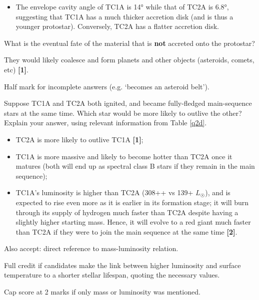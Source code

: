 \documentclass[a4paper,11pt,draft]{exam}
\begin{document}
\begin{questions}
\begin{solution}
\begin{itemize}[leftmargin=10pt]
			\item The envelope cavity angle of TC1A is \ang{14} while that of TC2A is \ang{6.8}, suggesting that TC1A has a much thicker accretion disk (and is thus a younger protostar). Conversely, TC2A has a flatter accretion disk. 
		\end{itemize}
	\end{solution}

\filbreak
\question[1]
	What is the eventual fate of the material that is \textbf{not} accreted onto the protostar?
	\droppoints
	\begin{solution}
		They would likely coalesce and form planets and other objects (asteroids, comets, etc) \textbf{[1]}. 
		
		Half mark for incomplete answers (e.g. `becomes an asteroid belt').
	\end{solution}
	
\question[3]
	Suppose TC1A and TC2A both ignited, and became fully-fledged main-sequence stars at the same time. Which star would be more likely to outlive the other? Explain your answer, using relevant information from Table \ref{q2d}.
	\droppoints
	\begin{solution}
		\begin{itemize}[leftmargin=10pt]
			\item TC2A is more likely to outlive TC1A \textbf{[1]};
			
			\item TC1A is more massive and likely to become hotter than TC2A once it matures (both will end up as spectral class B stars if they remain in the main sequence);
			
			\item TC1A’s luminosity is higher than TC2A (308++ vs 139+ $ L_{\astrosun} $), and is expected to rise even more as it is earlier in its formation stage; it will burn through its supply of hydrogen much faster than TC2A despite having a slightly higher starting mass. Hence, it will evolve to a red giant much faster than TC2A if they were to join the main sequence at the same time \textbf{[2]}.  
		\end{itemize}
	
		Also accept: direct reference to mass-luminosity relation.
		
		Full credit if candidates make the link between higher luminosity and surface temperature to a shorter stellar lifespan, quoting the necessary values. 
		
		Cap score at 2 marks if only mass or luminosity was mentioned.
	\end{solution}


\end{questions}
\end{document}
